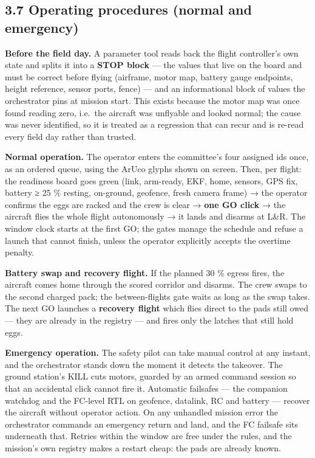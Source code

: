 \documentclass[
  10pt,
  a4paper,
  titlepage]{article}
\begin{document}
\hypertarget{operating-procedures-normal-and-emergency}{%
\subsection{3.7 Operating procedures (normal and
emergency)}\label{operating-procedures-normal-and-emergency}}

\textbf{Before the field day.} A parameter tool reads back the flight
controller's own state and splits it into a \textbf{STOP block} --- the
values that live on the board and must be correct before flying
(airframe, motor map, battery gauge endpoints, height reference, sensor
ports, fence) --- and an informational block of values the orchestrator
pins at mission start. This exists because the motor map was once found
reading zero, i.e.~the aircraft was unflyable and looked normal; the
cause was never identified, so it is treated as a regression that can
recur and is re-read every field day rather than trusted.

\textbf{Normal operation.} The operator enters the committee's four
assigned ids once, as an ordered queue, using the ArUco glyphs shown on
screen. Then, per flight: the readiness board goes green (link,
arm-ready, EKF, home, sensors, GPS fix, battery ≥ 25 \% resting,
on-ground, geofence, fresh camera frame) → the operator confirms the
eggs are racked and the crew is clear → \textbf{one GO click} → the
aircraft flies the whole flight autonomously → it lands and disarms at
L\&R. The window clock starts at the first GO; the gates manage the
schedule and refuse a launch that cannot finish, unless the operator
explicitly accepts the overtime penalty.

\textbf{Battery swap and recovery flight.} If the planned 30 \% egress
fires, the aircraft comes home through the scored corridor and disarms.
The crew swaps to the second charged pack; the between-flights gate
waits as long as the swap takes. The next GO launches a \textbf{recovery
flight} which flies direct to the pads still owed --- they are already
in the registry --- and fires only the latches that still hold eggs.

\textbf{Emergency operation.} The safety pilot can take manual control
at any instant, and the orchestrator stands down the moment it detects
the takeover. The ground station's KILL cuts motors, guarded by an armed
command session so that an accidental click cannot fire it. Automatic
failsafes --- the companion watchdog and the FC-level RTL on geofence,
datalink, RC and battery --- recover the aircraft without operator
action. On any unhandled mission error the orchestrator commands an
emergency return and land, and the FC failsafe sits underneath that.
Retries within the window are free under the rules, and the mission's
own registry makes a restart cheap: the pads are already known.
\end{document}
